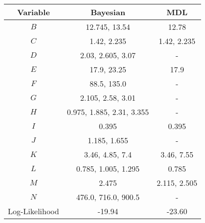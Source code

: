 \scriptsize
\begin{tabular}{@{}ccc@{}}
\toprule
Variable & Bayesian            & MDL          \\
\midrule
$B$    & 12.745, 13.54             & 12.78        \\
$C$    & 1.42, 2.235               & 1.42, 2.235  \\
$D$    & 2.03, 2.605, 3.07         & -            \\
$E$    & 17.9, 23.25               & 17.9         \\
$F$    & 88.5, 135.0               & -            \\
$G$    & 2.105, 2.58, 3.01         & -            \\
$H$    & 0.975, 1.885, 2.31, 3.355 & -            \\
$I$    & 0.395                     & 0.395        \\
$J$    & 1.185, 1.655              & -            \\
$K$    & 3.46, 4.85, 7.4           & 3.46, 7.55   \\
$L$    & 0.785, 1.005, 1.295       & 0.785        \\
$M$    & 2.475                     & 2.115, 2.505 \\
$N$    & 476.0, 716.0, 900.5       & -            \\
\addlinespace[0.5em]
Log-Likelihood   & -19.94                    & -23.60        \\
\bottomrule
\end{tabular}